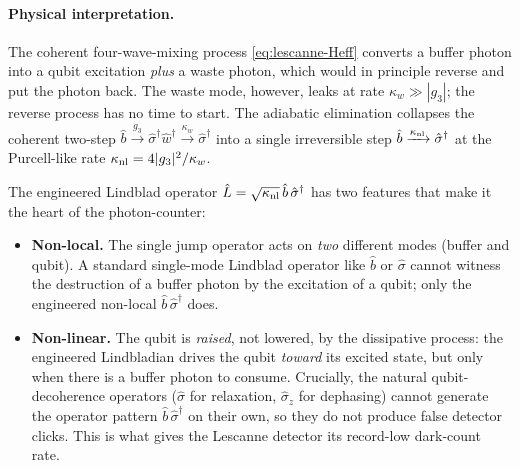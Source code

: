 \paragraph{Physical interpretation.}
The coherent four-wave-mixing process \cref{eq:lescanne-Heff}
converts a buffer photon into a qubit excitation \emph{plus} a
waste photon, which would in principle reverse and put the photon
back. The waste mode, however, leaks at rate $\kappa_w\gg|g_3|$;
the reverse process has no time to start. The adiabatic elimination
collapses the coherent two-step
$\hat b\xrightarrow{g_3}\hat\sigma^\dagger\hat w^\dagger
\xrightarrow{\kappa_w}\hat\sigma^\dagger$
into a single irreversible step
$\hat b\xrightarrow{\kappa_{\rm nl}}\hat\sigma^\dagger$
at the Purcell-like rate $\kappa_{\rm nl}=4|g_3|^2/\kappa_w$.

The engineered Lindblad operator
$\hat{L}=\sqrt{\kappa_{\rm nl}}\,\hat b\,\hat\sigma^\dagger$
has two features that make it the heart of the photon-counter:
\begin{itemize}
  \item \textbf{Non-local.} The single jump operator acts on
        \emph{two} different modes (buffer and qubit). A standard
        single-mode Lindblad operator like $\hat b$ or $\hat\sigma$
        cannot witness the destruction of a buffer photon by
        the excitation of a qubit; only the engineered non-local
        $\hat b\,\hat\sigma^\dagger$ does.
  \item \textbf{Non-linear.} The qubit is \emph{raised}, not
        lowered, by the dissipative process: the engineered
        Lindbladian drives the qubit \emph{toward} its excited
        state, but only when there is a buffer photon to consume.
        Crucially, the natural qubit-decoherence operators
        ($\hat\sigma$ for relaxation, $\hat\sigma_z$ for
        dephasing) cannot generate the operator pattern
        $\hat b\,\hat\sigma^\dagger$ on their own, so they do
        not produce false detector clicks. This is what gives
        the Lescanne detector its record-low dark-count rate.
\end{itemize}


